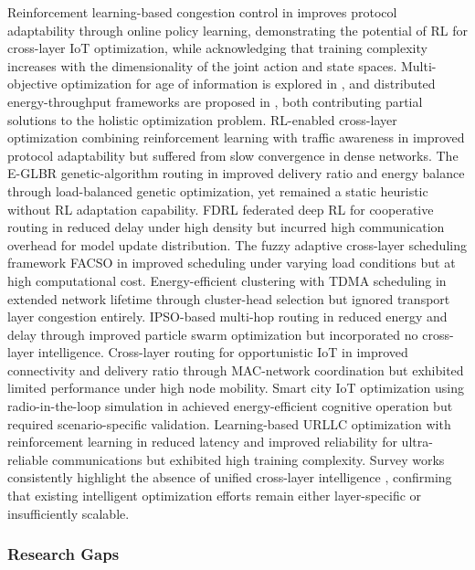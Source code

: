 \documentclass[a4paper]{cas-dc}
\numberwithin{equation}{section}
\begin{document}
Reinforcement learning-based congestion control in \cite{Serra2025} improves protocol adaptability through online policy learning, demonstrating the potential of RL for cross-layer IoT optimization, while acknowledging that training complexity increases with the dimensionality of the joint action and state spaces. Multi-objective optimization for age of information is explored in \cite{Li202510349}, and distributed energy-throughput frameworks are proposed in \cite{Singh2025}, both contributing partial solutions to the holistic optimization problem. RL-enabled cross-layer optimization combining reinforcement learning with traffic awareness in \cite{Musaddiq20201} improved protocol adaptability but suffered from slow convergence in dense networks. The E-GLBR genetic-algorithm routing in \cite{Benelhouri2023} improved delivery ratio and energy balance through load-balanced genetic optimization, yet remained a static heuristic without RL adaptation capability. FDRL federated deep RL for cooperative routing in \cite{Suresh2024} reduced delay under high density but incurred high communication overhead for model update distribution. The fuzzy adaptive cross-layer scheduling framework FACSO in \cite{Yang2024204} improved scheduling under varying load conditions but at high computational cost. Energy-efficient clustering with TDMA scheduling in \cite{Chaurasiya202325941} extended network lifetime through cluster-head selection but ignored transport layer congestion entirely. IPSO-based multi-hop routing in \cite{Zhang2025} reduced energy and delay through improved particle swarm optimization but incorporated no cross-layer intelligence. Cross-layer routing for opportunistic IoT in \cite{Khalil2024} improved connectivity and delivery ratio through MAC-network coordination but exhibited limited performance under high node mobility. Smart city IoT optimization using radio-in-the-loop simulation in \cite{Böhm2024157} achieved energy-efficient cognitive operation but required scenario-specific validation. Learning-based URLLC optimization with reinforcement learning in \cite{Zhang202214629} reduced latency and improved reliability for ultra-reliable communications but exhibited high training complexity. Survey works consistently highlight the absence of unified cross-layer intelligence \cite{Mustafa2024}, confirming that existing intelligent optimization efforts remain either layer-specific or insufficiently scalable.

\subsubsection*{Research Gaps}
\end{document}

